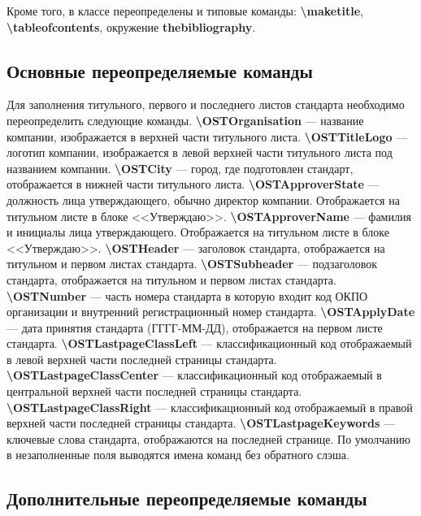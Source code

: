\documentclass[12pt, twoside, final]{ruost}
\newcommand{\txtcmd}[1]{\textbf{\textbackslash{}#1}}
\begin{document}
\begin{OST}
				\point Кроме того, в классе переопределены и типовые команды: \txtcmd{maketitle}, \txtcmd{tableofcontents}, окружение \textbf{thebibliography}.
			
			\subsection{Основные переопределяемые команды}
			
				\point Для заполнения титульного, первого и последнего листов стандарта необходимо переопределить следующие команды.
					\subpoint \txtcmd{OSTOrganisation} --- название компании, изображается в верхней части титульного листа.
					\subpoint \txtcmd{OSTTitleLogo} --- логотип компании, изображается в левой верхней части титульного листа под названием компании.
					\subpoint \txtcmd{OSTCity} --- город, где подготовлен стандарт, отображается в нижней части титульного листа.
					\subpoint \txtcmd{OSTApproverState} --- должность лица утверждающего, обычно директор компании. Отображается на титульном листе в блоке <<Утверждаю>>.
					\subpoint \txtcmd{OSTApproverName} --- фамилия и инициалы лица утверждающего. Отображается на титульном листе в блоке <<Утверждаю>>.
					\subpoint \txtcmd{OSTHeader} --- заголовок стандарта, отображается на титульном и первом листах стандарта.
					\subpoint \txtcmd{OSTSubheader} --- подзаголовок стандарта, отображается на титульном и первом листах стандарта.
					\subpoint \txtcmd{OSTNumber} --- часть номера стандарта в которую входит код ОКПО организации и внутренний регистрационный номер стандарта.
					\subpoint \txtcmd{OSTApplyDate} --- дата принятия стандарта (ГГГГ-ММ-ДД), отображается на первом листе стандарта.
					\subpoint \txtcmd{OSTLastpageClassLeft} --- классификационный код отображаемый в левой верхней части последней страницы стандарта.
					\subpoint \txtcmd{OSTLastpageClassCenter} --- классификационный код отображаемый в центральной верхней части последней страницы стандарта.
					\subpoint \txtcmd{OSTLastpageClassRight} --- классификационный код отображаемый в правой верхней части последней страницы стандарта.
					\subpoint \txtcmd{OSTLastpageKeywords} --- ключевые слова стандарта, отображаются на последней странице.
				\point По умолчанию в незаполненные поля выводятся имена команд без обратного слэша.
			
			\subsection{Дополнительные переопределяемые команды}
			

\end{OST}
\end{document}
